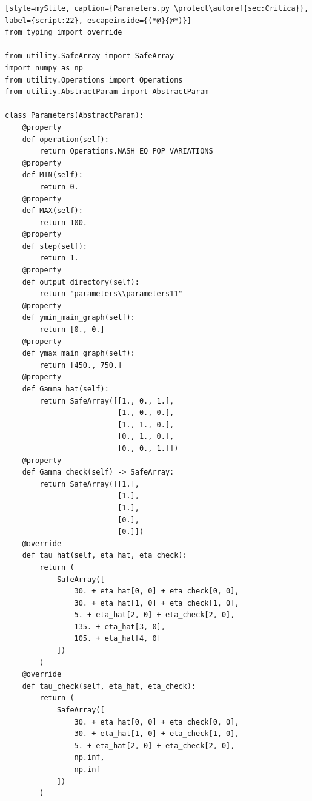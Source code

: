 \begin{lstlisting}[style=myStile, caption={Parameters.py \protect\autoref{sec:Critica}}, label={script:22}, escapeinside={(*@}{@*)}]
from typing import override

from utility.SafeArray import SafeArray
import numpy as np
from utility.Operations import Operations
from utility.AbstractParam import AbstractParam

class Parameters(AbstractParam):
    @property
    def operation(self):
        return Operations.NASH_EQ_POP_VARIATIONS
    @property
    def MIN(self):
        return 0.
    @property
    def MAX(self):
        return 100.
    @property
    def step(self):
        return 1.   
    @property
    def output_directory(self):
        return "parameters\\parameters11"
    @property
    def ymin_main_graph(self):
        return [0., 0.]   
    @property
    def ymax_main_graph(self):
        return [450., 750.]
    @property
    def Gamma_hat(self):
        return SafeArray([[1., 0., 1.],
                          [1., 0., 0.],
                          [1., 1., 0.],
                          [0., 1., 0.],
                          [0., 0., 1.]])   
    @property
    def Gamma_check(self) -> SafeArray:
        return SafeArray([[1.],
                          [1.],
                          [1.],
                          [0.],
                          [0.]])    
    @override
    def tau_hat(self, eta_hat, eta_check):        
        return (
            SafeArray([
                30. + eta_hat[0, 0] + eta_check[0, 0],
                30. + eta_hat[1, 0] + eta_check[1, 0],
                5. + eta_hat[2, 0] + eta_check[2, 0],
                135. + eta_hat[3, 0],
                105. + eta_hat[4, 0]
            ])
        )   
    @override
    def tau_check(self, eta_hat, eta_check):
        return (
            SafeArray([
                30. + eta_hat[0, 0] + eta_check[0, 0],
                30. + eta_hat[1, 0] + eta_check[1, 0],
                5. + eta_hat[2, 0] + eta_check[2, 0],
                np.inf,
                np.inf
            ])
        )
\end{lstlisting}

